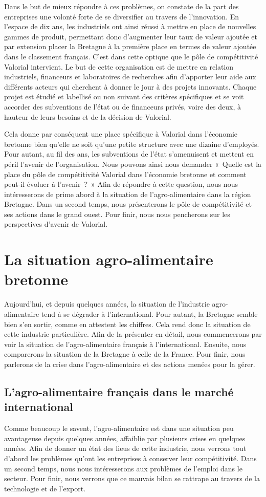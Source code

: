 \documentclass[a4paper,10pt]{report}
\begin{document}
	 Dans le but de mieux répondre à ces problèmes, on constate de la part des entreprises une volonté forte de se diversifier au travers de l’innovation. En l’espace de dix ans, les industriels ont ainsi réussi à mettre en place de nouvelles gammes de produit, permettant donc d’augmenter leur taux de valeur ajoutée et par extension placer la Bretagne à la première place en termes de valeur ajoutée dans le classement français. C’est dans cette optique que le pôle de compétitivité Valorial intervient. Le but de cette organisation est de mettre en relation industriels, financeurs et laboratoires de recherches afin d’apporter leur aide aux différents acteurs qui cherchent à donner le jour à des projets innovants. Chaque projet est étudié et labellisé ou non suivant des critères spécifiques et se voit accorder des subventions de l’état ou de financeurs privés, voire des deux, à hauteur de leurs besoins et de la décision de Valorial.
	 
	 Cela donne par conséquent une place spécifique à Valorial dans l’économie bretonne bien qu’elle ne soit qu’une petite structure avec une dizaine d’employés. Pour autant, au fil des ans, les subventions de l’état s’amenuisent et mettent en péril l’avenir de l’organisation. Nous pouvons ainsi nous demander « Quelle est la place du pôle de compétitivité Valorial dans l’économie bretonne et comment peut-il évoluer à l’avenir ? » Afin de répondre à cette question, nous nous intéresserons de prime abord à la situation de l’agro-alimentaire dans la région Bretagne. Dans un second temps, nous présenterons le pôle de compétitivité et ses actions dans le grand ouest. Pour finir, nous nous pencherons sur les perspectives d’avenir de Valorial.
	 
\chapter{La situation agro-alimentaire bretonne}
Aujourd’hui, et depuis quelques années, la situation de l’industrie agro-alimentaire tend à se dégrader à l’international. Pour autant, la Bretagne semble bien s’en sortir, comme en attestent les chiffres. Cela rend donc la situation de cette industrie particulière. Afin de la présenter en détail, nous commencerons par voir la situation de l’agro-alimentaire français à l’international. Ensuite, nous comparerons la situation de la Bretagne à celle de la France. Pour finir, nous parlerons de la crise dans l’agro-alimentaire et des actions menées pour la gérer.

\section{L’agro-alimentaire français dans le marché international}
Comme beaucoup le savent, l’agro-alimentaire est dans une situation peu avantageuse depuis quelques années, affaiblie par plusieurs crises en quelques années. Afin de donner un état des lieus de cette industrie, nous verrons tout d’abord les problèmes qu’ont les entreprises à conserver leur compétitivité. Dans un second temps, nous nous intéresserons aux problèmes de l’emploi dans le secteur. Pour finir, nous verrons que ce mauvais bilan se rattrape au travers de la technologie et de l’export.
\end{document}
